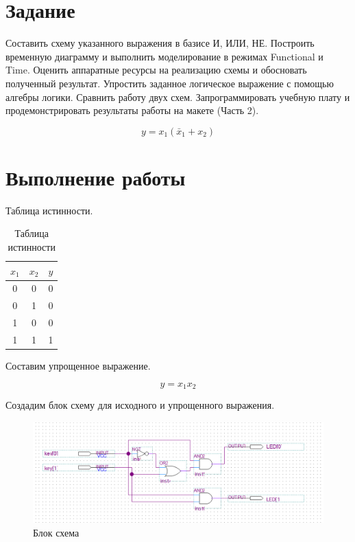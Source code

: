 \documentclass[a4paper,14pt]{article}
\begin{document}

\tableofcontents
\pagebreak

\section{Задание}

Составить схему указанного выражения в базисе И, ИЛИ, НЕ. 
Построить временную диаграмму и выполнить моделирование в режимах Functional и Time. 
Оценить аппаратные ресурсы на реализацию схемы и обосновать полученный результат. 
Упростить заданное логическое выражение с помощью алгебры логики. 
Сравнить работу двух схем. 
Запрограммировать учебную плату и продемонстрировать результаты работы на макете (Часть 2).

$$ y = x_1 (\bar{x}_1 + x_2)$$

\section{Выполнение работы}

Таблица истинности.

\begin{table}[H]
	\caption{Таблица истинности}
	\centering
	\begin{tabular}{|c|c|c|}
		\hline
		$x_1$ & $x_2$ & $y$ \\ \hline
		0    & 0    & 0 \\ \hline
		0    & 1    & 0 \\ \hline
		1    & 0    & 0 \\ \hline
		1    & 1    & 1 \\ \hline
	\end{tabular}
\end{table}

Составим упрощенное выражение.

$$ y = x_1 x_2 $$

Создадим блок схему для исходного и упрощенного выражения.

\begin{figure}[H]
	\centering
	\includegraphics[width=\linewidth]{image/schema}
	\caption{Блок схема}
	\label{fig:schema}
\end{figure}
\end{document}
